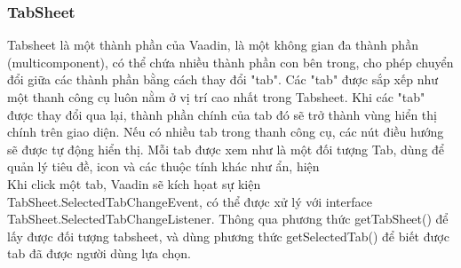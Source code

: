 \subsubsection{TabSheet}
\hspace{0.05\textwidth} Tabsheet là một thành phần của Vaadin, là một không gian đa thành phần (multicomponent), có thể chứa nhiều thành phần con bên trong, cho phép chuyển đổi giữa các thành phần bằng cách thay đổi "tab". Các "tab" được sắp xếp như một thanh công cụ luôn nằm ở vị trí cao nhất trong Tabsheet. Khi các "tab" được thay đổi qua lại, thành phần chính của tab đó sẽ trở thành vùng hiển thị chính trên giao diện. Nếu có nhiều tab trong thanh công cụ, các nút điều hướng sẽ được tự động hiển thị. Mỗi tab được xem như là một đối tượng Tab, dùng để quản lý tiêu đề, icon và các thuộc tính khác như ẩn, hiện 
\\
Khi click một tab, Vaadin sẽ kích họat sự kiện TabSheet.SelectedTabChangeEvent, có thể 
được xử lý với interface TabSheet.SelectedTabChangeListener. Thông qua phương thức 
getTabSheet() để lấy được đối tượng tabsheet, và dùng phương thức getSelectedTab() để biết được tab đã được người dùng lựa chọn.

